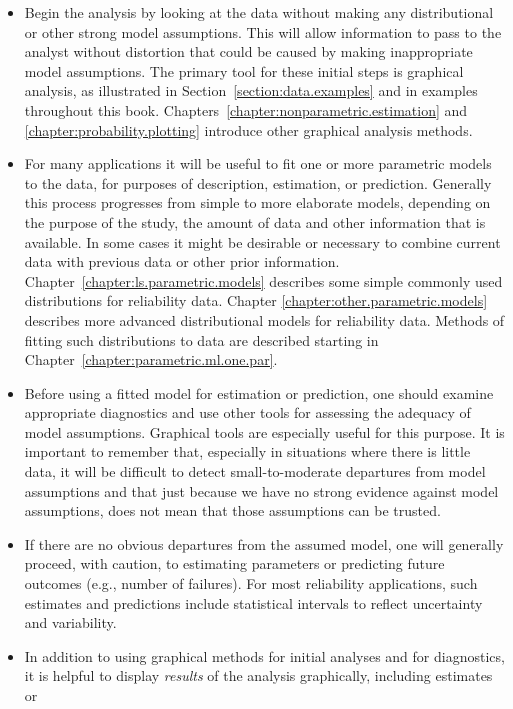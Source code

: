\begin{itemize}
\item
Begin the analysis by looking at the data without making any
distributional or other strong model assumptions. This will allow
information to pass to the analyst without distortion that could be
caused by making inappropriate model assumptions.  The primary tool
for these initial steps is graphical analysis, as illustrated in
Section~\ref{section:data.examples} and in examples throughout this
book. Chapters~\ref{chapter:nonparametric.estimation} and
\ref{chapter:probability.plotting} introduce other graphical analysis
methods. 
\item
For many applications it will be useful to fit one or more parametric
models to the data, for purposes of description, estimation, or
prediction.  Generally this process progresses from simple to more
elaborate models, depending on the purpose of the study, the amount of
data and other information that is available.  In some cases it might
be desirable or necessary to combine current data with previous data
or other prior information.
Chapter~\ref{chapter:ls.parametric.models} describes some simple
commonly used distributions for reliability data. Chapter
\ref{chapter:other.parametric.models} describes more
advanced distributional
models for reliability data.
Methods of fitting such distributions to data are described starting in
Chapter~\ref{chapter:parametric.ml.one.par}.
\item
Before using a fitted model for estimation or prediction, one should
examine appropriate diagnostics and use other tools for assessing the
adequacy of model assumptions.  Graphical tools are especially useful
for this purpose.  It is important to remember that, especially in
situations where there is little data, it will be difficult to detect
small-to-moderate departures from model assumptions and that just
because we have no strong evidence against model assumptions, does not
mean that those assumptions can be trusted.
\item
If there are no obvious departures from the assumed model, one will
generally proceed, with caution, to estimating parameters or
predicting future outcomes (e.g., number of failures). For most
reliability applications, such estimates and predictions include
statistical intervals to reflect uncertainty and variability.
\item
In addition to using graphical methods for initial analyses
and for diagnostics, it is helpful to 
display {\em results} of the analysis graphically, including estimates or

\end{itemize}
